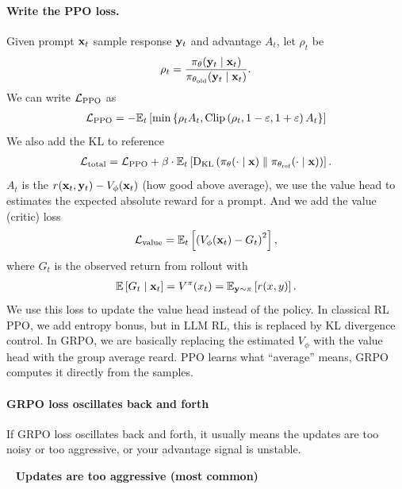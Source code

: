 \documentclass[11pt]{article}  %
\begin{document}
\paragraph{Write the PPO loss.}
Given prompt $\mathbf{x}_t$ sample response $\mathbf{y}_t$ and advantage $A_t$, let $\rho_t$ be 
\begin{align*}
  \rho_t = \frac{\pi_{\theta}(\mathbf{y}_t \mid \mathbf{x}_t)}{\pi_{\theta_{\text{old}}}(\mathbf{y}_t \mid \mathbf{x}_t)}.
\end{align*}
We can write $\mathcal{L}_{\text{PPO}}$ as 
\begin{align*}
  \mathcal{L}_{\text{PPO}} = - \mathbb{E}_{t}\left[\min \left\{ \rho_t A_t, \operatorname{Clip}\left( \rho_t, 1 - \varepsilon, 1 + \varepsilon \right)A_t \right\}\right]
\end{align*}
We also add the KL to reference
\begin{align*}
  \mathcal{L}_{\text{total}} = \mathcal{L}_{\text{PPO}} + \beta \cdot \mathbb{E}_{t}\left[{\rm D}_{\text{KL}}\left( \pi_\theta(\cdot \mid \mathbf{x}) \parallel \pi_{\theta_{\text{ref}}}(\cdot \mid \mathbf{x}) \right)\right].
\end{align*}
$A_t$ is the $r(\mathbf{x}_t, \mathbf{y}_t) - V_{\phi}(\mathbf{x}_t)$ (how good above average), we use the value head to estimates the expected absolute reward for a prompt.
And we add the value (critic) loss
\begin{align*}
  \mathcal{L}_{\text{value}} = \mathbb{E}_{t}\left[\left( V_{\phi}(\mathbf{x}_t) - G_t \right)^2\right],
\end{align*}
where $G_t$ is the observed return from rollout with 
\begin{align*}
  \mathbb{E}\left[G_t \mid \mathbf{x}_t\right] = V^{\pi}(x_t) = \mathbb{E}_{\mathbf{y} \sim \pi}\left[r(x, y)\right].
\end{align*}
We use this loss to update the value head instead of the policy.
In classical RL PPO, we add entropy bonus, but in LLM RL, this is replaced by KL divergence control.
In GRPO, we are basically replacing the estimated $V_{\phi}$ with the value head with the group average reard.
PPO learns what ``average'' means, GRPO computes it directly from the samples.


\paragraph{GRPO loss oscillates back and forth}

If GRPO loss oscillates back and forth, it usually means the updates are too noisy or too aggressive, or your advantage signal is unstable.

\textbullet~ \textbf{Updates are too aggressive (most common)}
\end{document}
